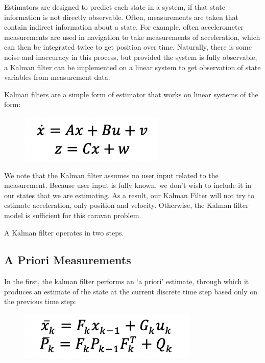 \documentclass[12pt,onecolumn,reqno]{amsart}
\begin{document}
Estimators are designed to predict each state in a system, if that state
information is not directly observable. Often, measurements are taken that
contain indirect information about a state. For example, often accelerometer
measurements are used in navigation to take measurements of acceleration, which
can then be integrated twice to get position over time. Naturally, there is some
noise and inaccuracy in this process, but provided the system is fully
observable, a Kalman filter can be implemented on a linear system to get
observation of state variables from measurement data. 

Kalman filters are a simple form of estimator that works on linear systems of the form:

\begin{figure}[H]
	\includegraphics{system_eqs.png}
	\label{fig:Estimation System Equations}
\end{figure}

We note that the Kalman filter assumes no user input related to the measurement.
Because user input is fully known, we don't wish to include it in our states
that we are estimating. As a result, our Kalman Filter will not try to estimate
acceleration, only position and velocity. Otherwise, the Kalman filter model is
sufficient for this caravan problem.

A Kalman filter operates in two steps. 

\subsection{A Priori Measurements}
In the first, the kalman filter performs an `a priori' estimate, through which
it produces an estimate of the state at the current discrete time step based
only on the previous time step:

\begin{figure}[H]
	\includegraphics{a_priori.png}
	\label{fig:A Priori Estimate}
\end{figure}
\end{document}
